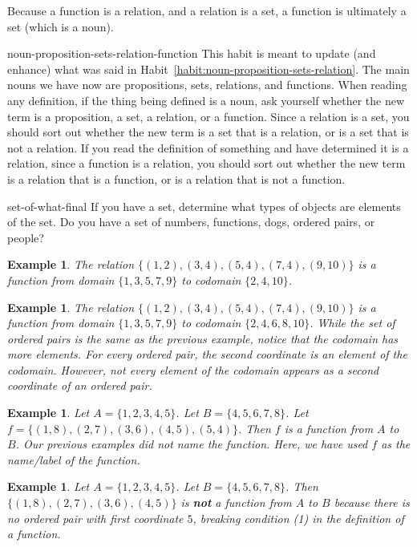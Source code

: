 \documentclass{book}
\newcounter{ekcounter}%
\theoremstyle{ekimcustom}
\newtheorem{example}[ekcounter]{Example}
\begin{document}
Because a function is a relation, and a relation is a set, a function is ultimately a set (which is a noun).
\begin{bhabit}{}{noun-proposition-sets-relation-function}
This habit is meant to update (and enhance) what was said in Habit~\ref{habit:noun-proposition-sets-relation}.
The main nouns we have now are propositions, sets, relations, and functions. When reading any definition, if the thing being defined is a noun, ask yourself whether the new term is a proposition, a set, a relation, or a function. Since a relation is a set, you should sort out whether the new term is a set that is a relation, or is a set that is not a relation.
\vskip6pt
If you read the definition of something and have determined it is a relation, since a function is a relation, you should sort out whether the new term is a relation that is a function, or is a relation that is not a function.
\end{bhabit}
\begin{bhabit}{}{set-of-what-final}
If you have a set, determine what types of objects are elements of the set. Do you have a set of numbers, functions, dogs, ordered pairs, or people?
\end{bhabit}
\begin{example}\label{example:first-function}
The relation $\{(1,2), (3,4), (5,4), (7,4), (9,10)\}$ is a function from domain $\{1,3,5,7,9\}$ to codomain $\{2,4,10\}$.
\end{example}
\begin{example}\label{example:second-function}
The relation $\{(1,2), (3,4), (5,4), (7,4), (9,10)\}$ is a function from domain $\{1,3,5,7,9\}$ to codomain $\{2,4,6,8,10\}$. While the set of ordered pairs is the same as the previous example, notice that the codomain has more elements. For every ordered pair, the second coordinate is an element of the codomain. However, not every element of the codomain appears as a second coordinate of an ordered pair.
\end{example}
\begin{example}\label{example:named-function}
Let $A = \{1,2,3,4,5\}$. Let $B = \{4,5,6,7,8\}$. Let $f = \{(1,8),(2,7),(3,6),(4,5),(5,4)\}$. Then $f$ is a function from $A$ to $B$. Our previous examples did not name the function. Here, we have used $f$ as the name/label of the function.
\end{example}
\begin{example}
Let $A = \{1,2,3,4,5\}$. Let $B = \{4,5,6,7,8\}$. Then $\{(1,8),(2,7),(3,6),(4,5)\}$ is {\bf not} a function from $A$ to $B$ because there is no ordered pair with first coordinate $5$, breaking condition (1) in the definition of a function.
\end{example}
\end{document}
